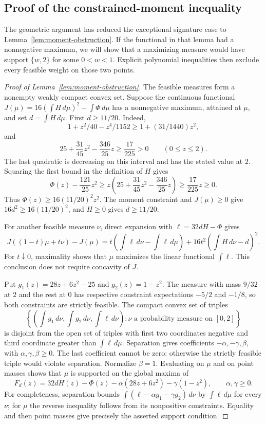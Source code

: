 \subsection{Proof of the constrained-moment inequality}

The geometric argument has reduced the exceptional signature case to
Lemma~\ref{lem:moment-obstruction}. If the functional in that lemma had
a nonnegative maximum, we will show that a maximizing measure would have
support $\{w,2\}$ for some $0<w<1$. Explicit polynomial inequalities
then exclude every feasible weight on those two points.

\begin{proof}[Proof of Lemma~\ref{lem:moment-obstruction}]
The feasible measures form a nonempty weakly compact convex set.
Suppose the continuous functional
$J(\mu)=16(\int H\,d\mu)^2-\int\Phi\,d\mu$ has a nonnegative maximum,
attained at $\mu$, and set $d=\int H\,d\mu$.  First $d\ge11/20$.
Indeed,
\[
 1+z^2/40-z^4/1152\ge1+(31/1440)z^2,
\]
and
\[
 25+\frac{31}{45}z^2-\frac{346}{25}z
 \ge\frac{17}{225}>0\qquad(0\le z\le2).
\]
The last quadratic is decreasing on this interval and has the stated
value at $2$. Squaring the first bound in the definition of $H$ gives
\[
 \Phi(z)-\frac{121}{25}z^2
 \ge z\left(25+\frac{31}{45}z^2-\frac{346}{25}z\right)
 \ge\frac{17}{225}z\ge0.
\]
Thus $\Phi(z)\ge16(11/20)^2z^2$. The moment constraint and
$J(\mu)\ge0$ give $16d^2\ge16(11/20)^2$, and $H\ge0$ gives
$d\ge11/20$.

For another feasible measure $\nu$, direct expansion with
$\ell=32dH-\Phi$ gives
\[
 J((1-t)\mu+t\nu)-J(\mu)
 =t\left(\int\ell\,d\nu-\int\ell\,d\mu\right)
 +16t^2\left(\int H\,d\nu-d\right)^2.
\]
For $t\downarrow0$, maximality shows that $\mu$ maximizes the linear
functional $\int\ell$.  This conclusion does not require concavity of
$J$.

Put $g_1(z)=28z+6z^2-25$ and $g_2(z)=1-z^2$.
The measure with mass $9/32$ at $2$ and the rest at $0$ has respective
constraint expectations $-5/2$ and $-1/8$, so both constraints are
strictly feasible.  The compact convex set of triples
\[
 \left\{\left(\int g_1\,d\nu,\int g_2\,d\nu,\int\ell\,d\nu\right):
                 \nu\text{ a probability measure on }[0,2]\right\}
\]
is disjoint from the open set of triples with first two coordinates
negative and third coordinate greater than $\int\ell\,d\mu$.
Separation gives coefficients $-\alpha,-\gamma,\beta$, with
$\alpha,\gamma,\beta\ge0$.  The last coefficient cannot be zero:
otherwise the strictly feasible triple would violate separation.
Normalize $\beta=1$.  Evaluating on $\mu$ and on point masses shows
that $\mu$ is supported on the global maxima of
\[
 F_d(z)=32dH(z)-\Phi(z)
          -\alpha(28z+6z^2)-\gamma(1-z^2),
 \qquad \alpha,\gamma\ge0.
\]
For completeness, separation bounds
$\int(\ell-\alpha g_1-\gamma g_2)\,d\nu$ by
$\int\ell\,d\mu$ for every $\nu$; for $\mu$ the reverse inequality
follows from its nonpositive constraints.  Equality and then point
masses give precisely the asserted support condition.


\end{proof}
